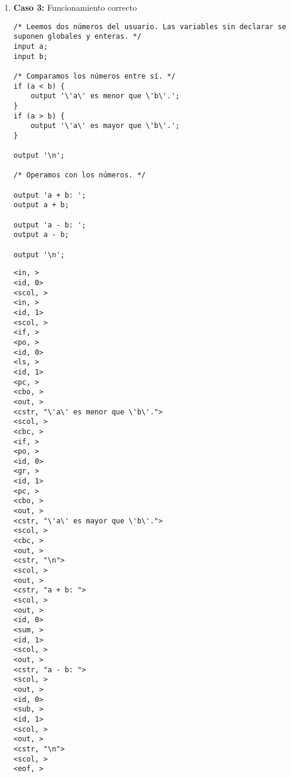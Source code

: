 \begin{enumerate}
    \begin{tcolorbox}[title={Volcado del fichero de tokens}, colback=white]
        \begin{lstlisting}
<fn, >
<void, >
<id, 0>
<po, >
<str, >
<id, 1>
<pc, >
<cbo, >
<out, >
<id, 1>
<scol, >
<out, >
<cstr, "\n">
<scol, >
<cbc, >
<id, 0>
<po, >
<cstr, "¡Hola mundo!">
<pc, >
<scol, >
<id, 0>
<po, >
<cstr, "Eso son llamadas a \'output\' usando una función.">
<pc, >
<scol, >
<eof, >
        \end{lstlisting}
    \end{tcolorbox}

    \begin{tcolorbox}[title={Volcado del fichero de la tabla de símbolos}, colback=white]
        \begin{lstlisting}
Tabla Global #0:
*'println'
*'s'
        \end{lstlisting}
    \end{tcolorbox}


    \item \textbf{Caso 3:} Funcionamiento correcto
    \begin{tcolorbox}[title={Código fuente}, colback=white]
        \begin{lstlisting}
/* Leemos dos números del usuario. Las variables sin declarar se suponen globales y enteras. */
input a;
input b;

/* Comparamos los números entre sí. */
if (a < b) {
    output '\'a\' es menor que \'b\'.';
}
if (a > b) {
    output '\'a\' es mayor que \'b\'.';
}

output '\n';

/* Operamos con los números. */

output 'a + b: ';
output a + b;

output 'a - b: ';
output a - b;

output '\n';
        \end{lstlisting}        
    \end{tcolorbox}

    \begin{tcolorbox}[title={Volcado del fichero de tokens}, colback=white]
        \begin{lstlisting}
<in, >
<id, 0>
<scol, >
<in, >
<id, 1>
<scol, >
<if, >
<po, >
<id, 0>
<ls, >
<id, 1>
<pc, >
<cbo, >
<out, >
<cstr, "\'a\' es menor que \'b\'.">
<scol, >
<cbc, >
<if, >
<po, >
<id, 0>
<gr, >
<id, 1>
<pc, >
<cbo, >
<out, >
<cstr, "\'a\' es mayor que \'b\'.">
<scol, >
<cbc, >
<out, >
<cstr, "\n">
<scol, >
<out, >
<cstr, "a + b: ">
<scol, >
<out, >
<id, 0>
<sum, >
<id, 1>
<scol, >
<out, >
<cstr, "a - b: ">
<scol, >
<out, >
<id, 0>
<sub, >
<id, 1>
<scol, >
<out, >
<cstr, "\n">
<scol, >
<eof, >
        \end{lstlisting}
    \end{tcolorbox}


\end{enumerate}

